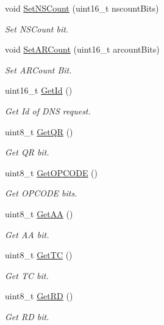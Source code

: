 \begin{DoxyCompactItemize}
void \hyperlink{classns3_1_1DnsPlusHeader_aae6d4997842c4e7674eb5da84aca1758}{Set\-N\-S\-Count} (uint16\-\_\-t nscount\-Bits)
\begin{DoxyCompactList}\small\item\em Set N\-S\-Count bit. \end{DoxyCompactList}\item 
void \hyperlink{classns3_1_1DnsPlusHeader_a77392a980ddd74a651c6b91e3a68e7cf}{Set\-A\-R\-Count} (uint16\-\_\-t arcount\-Bits)
\begin{DoxyCompactList}\small\item\em Set A\-R\-Count Bit. \end{DoxyCompactList}\item 
uint16\-\_\-t \hyperlink{classns3_1_1DnsPlusHeader_aae7edb215fce7562cb0946b87f8f84d0}{Get\-Id} ()
\begin{DoxyCompactList}\small\item\em Get Id of D\-N\-S request. \end{DoxyCompactList}\item 
uint8\-\_\-t \hyperlink{classns3_1_1DnsPlusHeader_aed50596c87046b01e05bd9851a69e82c}{Get\-Q\-R} ()
\begin{DoxyCompactList}\small\item\em Get Q\-R bit. \end{DoxyCompactList}\item 
uint8\-\_\-t \hyperlink{classns3_1_1DnsPlusHeader_a7c1f46655a3b37ce288922a10c0b1d85}{Get\-O\-P\-C\-O\-D\-E} ()
\begin{DoxyCompactList}\small\item\em Get O\-P\-C\-O\-D\-E bits. \end{DoxyCompactList}\item 
uint8\-\_\-t \hyperlink{classns3_1_1DnsPlusHeader_a3134d8329f6b6d30398bd85fd5dc680b}{Get\-A\-A} ()
\begin{DoxyCompactList}\small\item\em Get A\-A bit. \end{DoxyCompactList}\item 
uint8\-\_\-t \hyperlink{classns3_1_1DnsPlusHeader_a63a67866520ddb9348b1177fe2fc3e3e}{Get\-T\-C} ()
\begin{DoxyCompactList}\small\item\em Get T\-C bit. \end{DoxyCompactList}\item 
uint8\-\_\-t \hyperlink{classns3_1_1DnsPlusHeader_a6ba87b0dbc7c2198670c6c4e31f9a726}{Get\-R\-D} ()
\begin{DoxyCompactList}\small\item\em Get R\-D bit. \end{DoxyCompactList}\item 

\end{DoxyCompactItemize}
